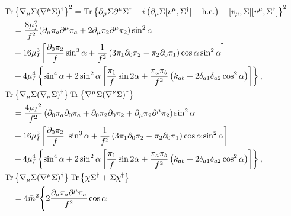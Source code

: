 \begin{align}
    \notag
    & \Tr{\nabla_\mu \Sigma (\nabla^\mu \Sigma)^\dagger}^2 
    =
    \Tr{\partial_\mu \Sigma \partial^\mu \Sigma ^\dagger
    - i \left( \partial_\mu \Sigma [v^\mu,\Sigma^\dagger] - \hc \right)
    - [v_\mu, \Sigma][v^\mu,\Sigma^\dagger]
    }^2 \\\notag
    &\quad  =
    \frac{8 \mu_I^2}{f^2} 
    (\partial_\mu \pi_a \partial^\mu \pi_a + 2 \partial_\mu \pi_2 \partial^\mu \pi_2)
    \sin^2{\alpha} \\\notag
    &\quad  + 16 \mu_I^3 \left[
        \frac{\partial_0 \pi_2}{f}
            \sin^3{\alpha}
        + \frac{1}{f^2} \left(3 \pi_1 \partial_0 \pi_2 - \pi_2 \partial_0 \pi_1\right)
            \cos{\alpha} \sin^2{\alpha}
    \right] \\ \label{l1}
    & \quad + 4 \mu_I^4 
    \left\{
        \sin^4{\alpha}
        + 2 \sin^2{\alpha}
        \left[
            \frac{\pi_1}{f}\sin{2\alpha}
            + \frac{\pi_a \pi_b}{f^2}        
            \left(k_{ab} + 2\delta_{a1}\delta_{a2}\cos^2{\alpha} \right)
        \right]
    \right\}, \\
    \notag
    & \Tr{\nabla_\mu \Sigma (\nabla_\nu \Sigma)^\dagger} \Tr{\nabla^\mu \Sigma (\nabla^\nu \Sigma)^\dagger}\\ \notag
    & \quad = \frac{4 \mu_I{}^2}{f^2}
    \left(
        \partial_0 \pi_a\partial_0 \pi_a + \partial_0 \pi_2\partial_0 \pi_2 + \partial_\mu \pi_2\partial^\mu \pi_2
    \right) \sin^2{\alpha} \\\notag
    &\quad  + 16 \mu_I^3 \left[
        \frac{\partial_0 \pi_2}{f}\
            \sin^3{\alpha}
        + \frac{1}{f^2} \left(3 \pi_1 \partial_0 \pi_2 - \pi_2 \partial_0 \pi_1\right)
        \cos{\alpha} \sin^2{\alpha}
    \right] \\\label{l2}
    & \quad + 4 \mu_I^4 
    \left\{
        \sin^4{\alpha}
        + 2 \sin^2{\alpha}
        \left[
            \frac{\pi_1}{f}\sin{2\alpha} 
            + \frac{\pi_a \pi_b}{f^2}        
            \left(k_{ab} + 2 \delta_{a1}\delta_{a2} \cos^2{\alpha} \right)
        \right]
    \right\}, \\
    \notag
    & \Tr{\nabla_\mu \Sigma (\nabla^\mu \Sigma)^\dagger} 
    \Tr{\chi \Sigma^\dagger + \Sigma \chi^\dagger } \\\label{l4}
    & \quad =
    4\bar m^2
    \Bigg\{
        2 \frac{\partial_\mu \pi_a \partial^\mu \pi_a}{f^2} \cos{\alpha}

\end{align}
